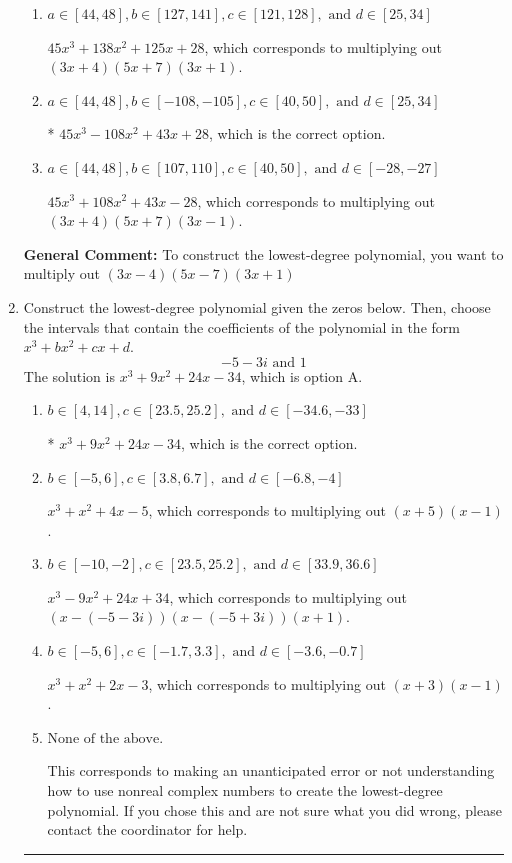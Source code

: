 \documentclass{extbook}[14pt]
\newcommand{\litem}[1]{\item #1

\rule{\textwidth}{0.4pt}}
\begin{document}
\begin{enumerate}
{\begin{enumerate}[label=\Alph*.]
$45x^{3} +12 x^{2} -85 x -28$, which corresponds to multiplying out $(3x + 4)(5x -7)(3x + 1)$.
\item \( a \in [44, 48], b \in [127, 141], c \in [121, 128], \text{ and } d \in [25, 34] \)

$45x^{3} +138 x^{2} +125 x + 28$, which corresponds to multiplying out $(3x + 4)(5x + 7)(3x + 1)$.
\item \( a \in [44, 48], b \in [-108, -105], c \in [40, 50], \text{ and } d \in [25, 34] \)

* $45x^{3} -108 x^{2} +43 x + 28$, which is the correct option.
\item \( a \in [44, 48], b \in [107, 110], c \in [40, 50], \text{ and } d \in [-28, -27] \)

$45x^{3} +108 x^{2} +43 x -28$, which corresponds to multiplying out $(3x + 4)(5x + 7)(3x -1)$.
\end{enumerate}

\textbf{General Comment:} To construct the lowest-degree polynomial, you want to multiply out $(3x -4)(5x -7)(3x + 1)$
}
\litem{
Construct the lowest-degree polynomial given the zeros below. Then, choose the intervals that contain the coefficients of the polynomial in the form $x^3+bx^2+cx+d$.
\[ -5 - 3 i \text{ and } 1 \]The solution is \( x^{3} +9 x^{2} +24 x -34 \), which is option A.\begin{enumerate}[label=\Alph*.]
\item \( b \in [4, 14], c \in [23.5, 25.2], \text{ and } d \in [-34.6, -33] \)

* $x^{3} +9 x^{2} +24 x -34$, which is the correct option.
\item \( b \in [-5, 6], c \in [3.8, 6.7], \text{ and } d \in [-6.8, -4] \)

$x^{3} + x^{2} +4 x -5$, which corresponds to multiplying out $(x + 5)(x -1)$.
\item \( b \in [-10, -2], c \in [23.5, 25.2], \text{ and } d \in [33.9, 36.6] \)

$x^{3} -9 x^{2} +24 x + 34$, which corresponds to multiplying out $(x-(-5 - 3 i))(x-(-5 + 3 i))(x + 1)$.
\item \( b \in [-5, 6], c \in [-1.7, 3.3], \text{ and } d \in [-3.6, -0.7] \)

$x^{3} + x^{2} +2 x -3$, which corresponds to multiplying out $(x + 3)(x -1)$.
\item \( \text{None of the above.} \)

This corresponds to making an unanticipated error or not understanding how to use nonreal complex numbers to create the lowest-degree polynomial. If you chose this and are not sure what you did wrong, please contact the coordinator for help.
\end{enumerate}

}
\end{enumerate}
\end{document}
